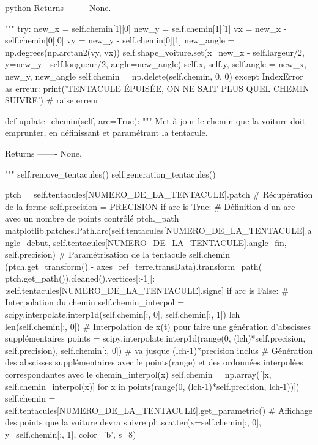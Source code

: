 \begin{mintedbox}{python}
        Returns
        -------
        None.

        """
        try:
            new_x = self.chemin[1][0]
            new_y = self.chemin[1][1]
            vx = new_x - self.chemin[0][0]
            vy = new_y - self.chemin[0][1]
            new_angle = np.degrees(np.arctan2(vy, vx))
            self.shape_voiture.set(x=new_x - self.largeur/2, y=new_y - self.longueur/2, angle=new_angle)
            self.x, self.y, self.angle = new_x, new_y, new_angle
            self.chemin = np.delete(self.chemin, 0, 0)
        except IndexError as erreur:
            print('TENTACULE ÉPUISÉE, ON NE SAIT PLUS QUEL CHEMIN SUIVRE')
            # raise erreur

    def update_chemin(self, arc=True):
        """
        Met à jour le chemin que la voiture doit emprunter, en définissant et paramétrant la tentacule.

        Returns
        -------
        None.

        """
        self.remove_tentacules()
        self.generation_tentacules()

        ptch = self.tentacules[NUMERO_DE_LA_TENTACULE].patch  # Récupération de la forme
        self.precision = PRECISION
        if arc is True:
            # Définition d'un arc avec un nombre de points contrôlé
            ptch._path = matplotlib.patches.Path.arc(self.tentacules[NUMERO_DE_LA_TENTACULE].angle_debut, self.tentacules[NUMERO_DE_LA_TENTACULE].angle_fin, self.precision)
        # Paramétrisation de la tentacule
        self.chemin = (ptch.get_transform() - axes_ref_terre.transData).transform_path( ptch.get_path()).cleaned().vertices[:-1][: :self.tentacules[NUMERO_DE_LA_TENTACULE].signe]
        if arc is False:
            # Interpolation du chemin
            self.chemin_interpol = scipy.interpolate.interp1d(self.chemin[:, 0], self.chemin[:, 1])
            lch = len(self.chemin[:, 0])
            # Interpolation de x(t) pour faire une génération d'abscisses supplémentaires
            points = scipy.interpolate.interp1d(range(0, (lch)*self.precision, self.precision), self.chemin[:, 0])  # va jusque (lch-1)*precision inclus
            # Génération des abscisses supplémentaires avec le points(range) et des ordonnées interpolées correspondantes avec le chemin_interpol(x)
            self.chemin = np.array([[x, self.chemin_interpol(x)] for x in points(range(0, (lch-1)*self.precision, lch-1))])
        self.chemin = self.tentacules[NUMERO_DE_LA_TENTACULE].get_parametric()
        # Affichage des points que la voiture devra suivre
        plt.scatter(x=self.chemin[:, 0], y=self.chemin[:, 1], color='b', s=8)


\end{mintedbox}

